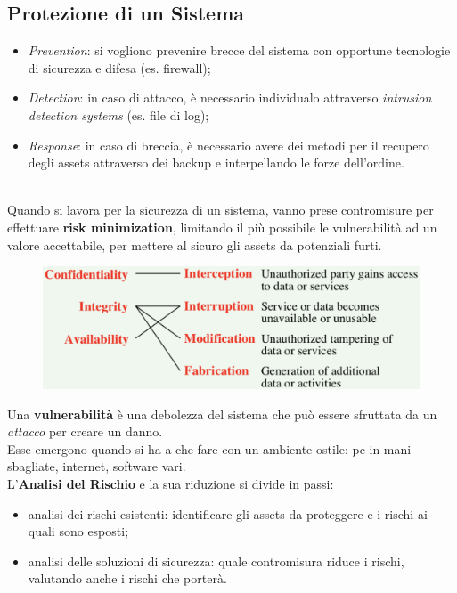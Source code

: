 \documentclass[11pt, a4paper, twoside, italian]{report}
\theoremstyle{plain}
\begin{document}
\subsection*{Protezione di un Sistema}
\begin{itemize}
	\item \textit{Prevention}: si vogliono prevenire brecce del sistema con opportune tecnologie di sicurezza e difesa (es. firewall);
	\item \textit{Detection}: in caso di attacco, è necessario individualo attraverso \textit{intrusion detection systems} (es. file di log);
	\item \textit{Response}: in caso di breccia, è necessario avere dei metodi per il recupero degli assets attraverso dei backup e interpellando le forze dell'ordine.
	\newline
\end{itemize}

\begin{multicols}{2}
	~\\
	\noindent
	Quando si lavora per la sicurezza di un sistema, vanno prese contromisure per effettuare \textbf{risk minimization}, limitando il più possibile le vulnerabilità ad un valore accettabile, per mettere al sicuro gli assets da potenziali furti.
	\columnbreak
	\begin{figure}[H]
		\centering
		\includegraphics[scale=0.5]{threats}
	\end{figure}
\end{multicols}
\noindent
Una \textbf{vulnerabilità} è una debolezza del sistema che può essere sfruttata da un \textit{attacco} per creare un danno.\\
Esse emergono quando si ha a che fare con un ambiente ostile: pc in mani sbagliate, internet, software vari.\\

\noindent
L'\textbf{Analisi del Rischio} e la sua riduzione si divide in passi:
\begin{itemize}
	\item analisi dei rischi esistenti: identificare gli assets da proteggere e i rischi ai quali sono esposti;
	\item analisi delle soluzioni di sicurezza: quale contromisura riduce i rischi, valutando anche i rischi che porterà.
\end{itemize}
\end{document}
